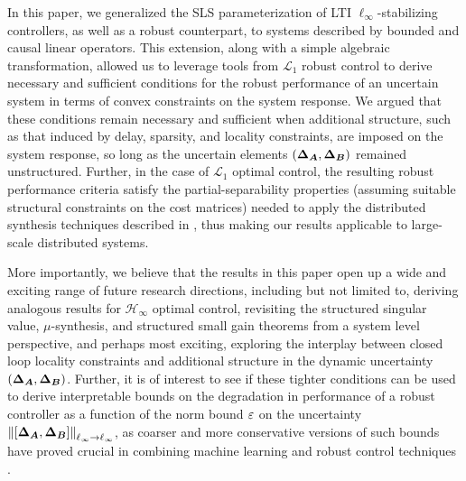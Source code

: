 In this paper, we generalized the SLS parameterization of LTI $\ell_\infty$-stabilizing controllers, as well as a robust counterpart, to systems described by bounded and causal linear operators.  This extension, along with a simple algebraic transformation, allowed us to leverage tools from $\mathcal{L}_1$ robust control to derive necessary and sufficient conditions for the robust performance of an uncertain system in terms of convex constraints on the system response.  We argued that these conditions remain necessary and sufficient when additional structure, such as that induced by delay, sparsity, and locality constraints, are imposed on the system response, so long as the uncertain elements $({\boldsymbol{\Delta}}_{\boldsymbol{A}},{\boldsymbol{\Delta}}_{\boldsymbol{B}})$ remained unstructured.  Further, in the case of $\mathcal{L}_1$ optimal control, the resulting robust performance criteria satisfy the partial-separability properties (assuming suitable structural constraints on the cost matrices) needed to apply the distributed synthesis techniques described in \cite{wang2018separable}, thus making our results applicable to large-scale distributed systems. 

More importantly, we believe that the results in this paper open up a wide and exciting range of future research directions, including but not limited to, deriving analogous results for $\mathcal{H}_\infty$ optimal control, revisiting the structured singular value, $\mu$-synthesis, and structured small gain theorems from a system level perspective, and perhaps most exciting, exploring the interplay between closed loop locality constraints and additional structure in the dynamic uncertainty $({\boldsymbol{\Delta}}_{\boldsymbol{A}},{\boldsymbol{\Delta}}_{\boldsymbol{B}})$.  Further, it is of interest to see if these tighter conditions can be used to derive interpretable bounds on the degradation in performance of a robust controller as a function of the norm bound $\varepsilon$ on the uncertainty $\left\|[{\boldsymbol{\Delta}}_{\boldsymbol{A}},{\boldsymbol{\Delta}}_{\boldsymbol{B}}]\right\|_{\ell_\infty\to\ell_\infty}$, as coarser and more conservative versions of such bounds have proved crucial in combining machine learning and robust control techniques \cite{dean2017sample,dean2018regret,dean2019safely}.
